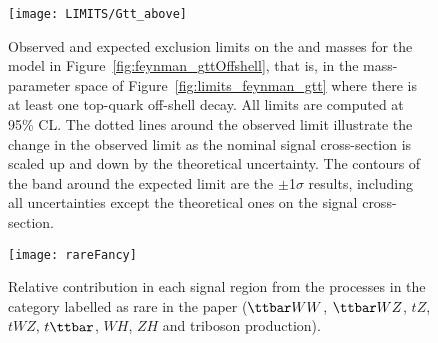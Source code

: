 \begin{figure}[p]
\centering
\texttt{[image: LIMITS/Gtt\_above]}
\caption{Observed and expected exclusion limits on the \gluino and \ninoone masses for the model in Figure~\ref{fig:feynman_gttOffshell}, 
that is, in the mass-parameter space of Figure~\ref{fig:limits_feynman_gtt} where there is at least one top-quark off-shell decay. 
All limits are computed at 95\% CL. The dotted lines around the observed limit illustrate the change in the observed limit as the 
nominal signal cross-section is scaled up and down by the theoretical uncertainty. The contours of the band around the expected 
limit are the $\pm$1$\sigma$ results, including all uncertainties except the theoretical ones on the signal cross-section.}
\label{fig:Results_Limits_Gttzoomed} 
\end{figure} 

\begin{figure}[htb]
\centering
\texttt{[image: rareFancy]}
\caption{Relative contribution in each signal region from the processes in the category labelled as rare in the paper ($\ttbar WW$, 
$\ttbar WZ$, $tZ$, $tWZ$, $t\ttbar$, $WH$, $ZH$ and triboson production). }
\label{fig:RareBreakdown} 
\end{figure} 

\clearpage

